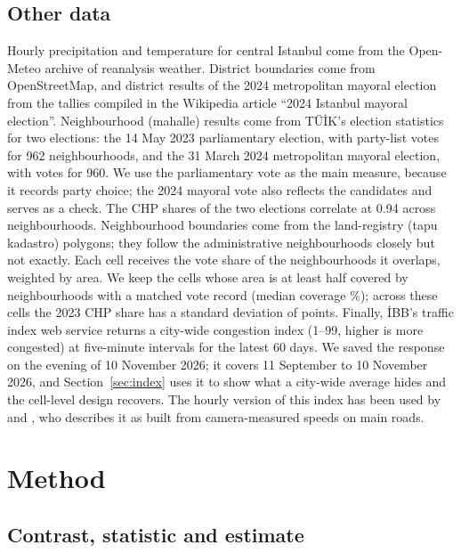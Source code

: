 \documentclass[11pt,a4paper]{article}
\begin{document}
\subsection{Other data}

Hourly precipitation and temperature for central Istanbul come from the Open-Meteo archive of
reanalysis weather. District boundaries come from OpenStreetMap, and district results of the 2024
metropolitan mayoral election from the tallies compiled in the Wikipedia article ``2024 Istanbul
mayoral election''. Neighbourhood (mahalle) results come from TÜİK's election statistics for two
elections: the 14 May 2023 parliamentary election, with party-list votes for 962 neighbourhoods, and
the 31 March 2024 metropolitan mayoral election, with votes for 960. We use the parliamentary vote
as the main measure, because it records party choice; the 2024 mayoral vote also reflects the
candidates and serves as a check. The CHP shares of the two elections correlate at 0.94 across
neighbourhoods. Neighbourhood
boundaries come from the land-registry (tapu kadastro) polygons; they follow the administrative
neighbourhoods closely but not exactly. Each cell receives the vote share of the neighbourhoods it
overlaps, weighted by area. We keep the \nCellsGeneral{} cells whose area is at least half covered by
neighbourhoods with a matched vote record (median coverage \medMatched\%); across these cells the
2023 CHP share has a standard deviation of \sdChpGeneral{} points. Finally, İBB's traffic index web
service returns a city-wide congestion index (1--99, higher is more congested) at five-minute
intervals for the latest 60 days. We saved the response on the evening of 10 November 2026; it
covers 11 September to 10 November 2026, and Section~\ref{sec:index} uses it to show what a
city-wide average hides and the cell-level design recovers. The hourly version of this index has
been used by \citet{alcan2022} and \citet{gulek2024}, who describes it as built from
camera-measured speeds on main roads.

\section{Method}

\subsection{Contrast, statistic and estimate}
\end{document}
